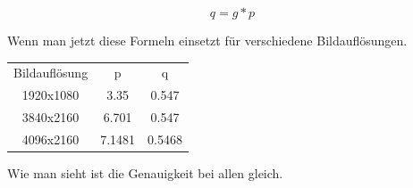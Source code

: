 \begin{equation}
q = g * p
\label{eq:precision}
\end{equation}

Wenn man jetzt diese Formeln einsetzt für verschiedene Bildauflösungen.

\begin{center}
    \begin{tabular}{ c c c }
    \label{tab:resolutions}
     Bildauflösung & p & q \\ 
     1920x1080 & 3.35 & 0.547 \\  
     3840x2160 & 6.701 & 0.547 \\
     4096x2160 & 7.1481 & 0.5468 \\ 
\end{tabular}
\end{center}

Wie man sieht ist die Genauigkeit  bei allen gleich.
